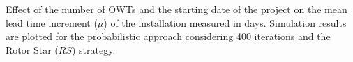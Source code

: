 \label{fig:seasonaleffect}
Effect of the number of OWTs and the starting date of the project on the mean lead time increment ($\mu$) of the installation measured in days. Simulation results are plotted for the probabilistic approach considering 400 iterations and the Rotor Star ($RS$) strategy.